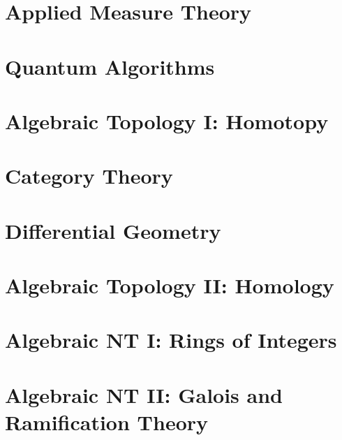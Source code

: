 \documentclass[11pt,twoside=semi,openright,numbers=noenddot]{scrreprt}
\begin{document}
\part{Applied Measure Theory}

\part{Quantum Algorithms}



\part{Algebraic Topology I: Homotopy}



\part{Category Theory}


\part{Differential Geometry}



\part{Algebraic Topology II: Homology}





\part{Algebraic NT I: Rings of Integers}






\part{Algebraic NT II: Galois and Ramification Theory}




\end{document}
